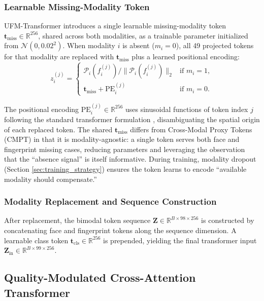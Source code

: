 \documentclass[10pt,journal,compsoc]{IEEEtran}
\begin{document}
\subsubsection{Learnable Missing-Modality Token}

UFM-Transformer introduces a single learnable missing-modality token $\mathbf{t}_{\text{miss}} \in \mathbb{R}^{256}$, shared across both modalities, as a trainable parameter initialized from $\mathcal{N}(0, 0.02^2)$. When modality $i$ is absent ($m_i = 0$), all 49 projected tokens for that modality are replaced with $\mathbf{t}_{\text{miss}}$ plus a learned positional encoding:
\begin{equation}
\label{eq:missing_replacement}
z_i^{(j)} = \begin{cases}
\mathcal{P}_i(f_i^{(j)}) / \|\mathcal{P}_i(f_i^{(j)})\|_2 & \text{if } m_i = 1, \\
\mathbf{t}_{\text{miss}} + \text{PE}_i^{(j)} & \text{if } m_i = 0.
\end{cases}
\end{equation}

The positional encoding $\text{PE}_i^{(j)} \in \mathbb{R}^{256}$ uses sinusoidal functions of token index $j$ following the standard transformer formulation \cite{vaswani2017attention}, disambiguating the spatial origin of each replaced token. The shared $\mathbf{t}_{\text{miss}}$ differs from Cross-Modal Proxy Tokens (CMPT) \cite{reza2025cmpt} in that it is modality-agnostic: a single token serves both face and fingerprint missing cases, reducing parameters and leveraging the observation that the ``absence signal'' is itself informative. During training, modality dropout (Section \ref{sec:training_strategy}) ensures the token learns to encode ``available modality should compensate.''

\subsubsection{Modality Replacement and Sequence Construction}

After replacement, the bimodal token sequence $\mathbf{Z} \in \mathbb{R}^{B \times 98 \times 256}$ is constructed by concatenating face and fingerprint tokens along the sequence dimension. A learnable class token $\mathbf{t}_{\text{cls}} \in \mathbb{R}^{256}$ is prepended, yielding the final transformer input $\mathbf{Z}_{\text{in}} \in \mathbb{R}^{B \times 99 \times 256}$.

\subsection{Quality-Modulated Cross-Attention Transformer}
\label{sec:qmcatt}
\end{document}
